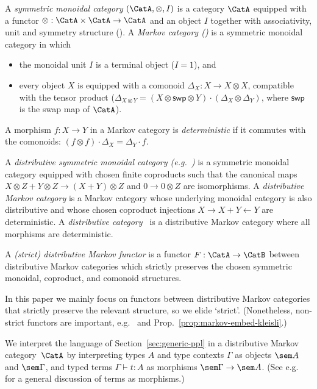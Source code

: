 \begin{definition}\label{def:distr-markov}
  A \emph{symmetric monoidal category} $(\CatA,\otimes,I)$ is
  a category $\CatA$ equipped with a functor ${\otimes :\CatA\times \CatA \to\CatA}$ and an object
  $I$ together with associativity, unit and symmetry structure (\cite[XI.1.]{maclane}).
  A \emph{Markov category (\cite{fritz})} is a symmetric monoidal category in which
  \begin{itemize}
  \item the monoidal unit $I$ is a terminal object ($I=1$), and
  \item 
    every object $X$ is equipped with a comonoid $\Delta_X:X\to X\otimes X$,
    compatible with the tensor product ($\Delta_{X\otimes Y}=(X\otimes\mathsf{swp}\otimes Y)\cdot (\Delta_X\otimes \Delta_Y)$, where $\mathsf{swp}$ is the swap map of $\CatA$). 
  \end{itemize}
  A morphism $f\colon X\to Y$ in a Markov category is
  \emph{deterministic} if it commutes with the comonoids:
  $(f\otimes f)\cdot \Delta_X=\Delta_Y\cdot f$. 

  A \emph{distributive symmetric monoidal category (e.g.~\cite{walters,jay-distr-monoidal})} is a symmetric monoidal category equipped with chosen finite coproducts such that
  the canonical maps $X\otimes Z + Y\otimes Z\to (X+Y)\otimes Z$
    and $0\to 0\otimes Z$ are isomorphisms.
  A \emph{distributive Markov category} is a Markov category whose
  underlying monoidal category is also distributive and
  whose chosen coproduct injections $X\to X+Y\leftarrow Y$ are
  deterministic.
  A \emph{distributive category~\cite{clw,cockett-distr}} is a distributive Markov category
  where all morphisms are deterministic.
  
  A \emph{(strict) distributive Markov functor} is a functor $F : \CatA \to \CatB$ between distributive Markov categories which strictly preserves the chosen symmetric monoidal, coproduct, and comonoid structures.
\end{definition}
In this paper we mainly focus on functors between distributive Markov
categories that strictly preserve the relevant structure, so we elide
`strict'. (Nonetheless, non-strict functors are important,
e.g.~\cite[\S10.2]{fritz} and Prop.~\ref{prop:markov-embed-kleisli}.)

We interpret the language of Section~\ref{sec:generic-ppl} in a
distributive Markov category~$\CatA$ by interpreting types $A$ and
type contexts $\Gamma$ as objects $\sem A$ and $\sem \Gamma$, and
typed terms $\Gamma\vdash t :A $ as morphisms $\sem \Gamma\to \sem A$.
(See e.g.~\cite{pitts-cat-logic} for a general discussion of terms
as morphisms.) 

